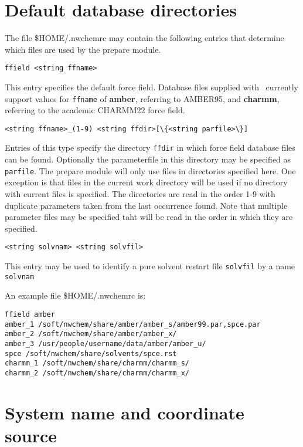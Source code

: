 \section{Default database directories}

The file \$HOME/.nwchemrc may contain the following entries that determine
which files are used by the prepare module.

\begin{verbatim}
ffield <string ffname>
\end{verbatim}

This entry specifies the default force field. Database files supplied with
\nwchem\ currently support values for \verb+ffname+ of {\bf amber}, referring 
to AMBER95, and {\bf charmm}, referring to the academic CHARMM22 force field.

\begin{verbatim}
<string ffname>_(1-9) <string ffdir>[\{<string parfile>\}]
\end{verbatim}

Entries of this type specify the directory \verb+ffdir+ in which force field 
database files can be found. Optionally the parameterfile in this directory
may be specified as \verb+parfile+. 
The prepare module will only use files in directories
specified here. One exception is that files in the current work directory
will be used if no directory with current files is specified. The directories
are read in the order 1-9 with duplicate parameters taken from the last
occurrence found. Note that multiple parameter files may be specified taht will
be read in the order in which they are specified.

\begin{verbatim}
<string solvnam> <string solvfil>
\end{verbatim}

This entry may be used to identify a pure solvent restart file \verb+solvfil+
by a name \verb+solvnam+

An example file \$HOME/.nwchemrc is:

\begin{verbatim}
ffield amber
amber_1 /soft/nwchem/share/amber/amber_s/amber99.par,spce.par
amber_2 /soft/nwchem/share/amber/amber_x/
amber_3 /usr/people/username/data/amber/amber_u/
spce /soft/nwchem/share/solvents/spce.rst
charmm_1 /soft/nwchem/share/charmm/charmm_s/
charmm_2 /soft/nwchem/share/charmm/charmm_x/
\end{verbatim}

\section{System name and coordinate source}

